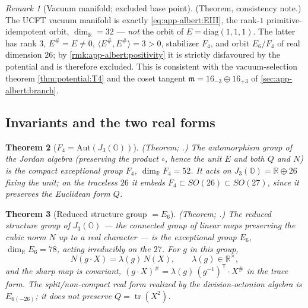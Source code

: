 \documentclass[11pt]{article}
\theoremstyle{plain}
\newtheorem{theorem}{Theorem}[section]
\theoremstyle{definition}
\theoremstyle{remark}
\newtheorem{remark}[theorem]{Remark}
\begin{document}
\begin{remark}[Vacuum manifold; excluded base point]\label{rmk:app-albert:vacuum}
\textup{(Theorem, consistency note.)}
The UCFT vacuum manifold is exactly \eqref{eq:app-albert:EIII}, the rank-$1$
primitive-idempotent orbit, $\dim_{\mathbb R}=32$ --- \emph{not} the orbit of
$E=\mathrm{diag}(1,1,1)$. The latter has rank $3$, $E^\#=E\neq0$,
$\langle E^\#,E^\#\rangle=3>0$, stabilizer $F_4$, and orbit $E_6/F_4$ of real
dimension $26$; by \autoref{rmk:app-albert:positivity} it is strictly disfavoured
by the potential and is therefore excluded. This is consistent with the
vacuum-selection theorem \autoref{thm:potential:T4} and the coset tangent
$\mathfrak m=16_{-3}\oplus\overline{16}_{+3}$ of \autoref{sec:app-albert:branch}.
\end{remark}

\subsection{Invariants and the two real forms}
\label{sec:app-albert:invariants}

\begin{theorem}[$F_4=\mathrm{Aut}(J_3(\mathbb O))$]\label{thm:app-albert:F4}
\label{thm:Invs}
\textup{(Theorem; \cite{Schafer:1966,Yokota:2009}.)}
The automorphism group of the Jordan algebra (preserving the product $\circ$,
hence the unit $E$ and \emph{both} $Q$ and $N$) is the compact exceptional group
$F_4$, $\dim_{\mathbb R}F_4=52$. It acts on $J_3(\mathbb O)=\mathbb R\oplus 26$
fixing the unit; on the traceless $26$ it embeds $F_4\subset SO(26)\subset
SO(27)$, since it preserves the Euclidean form $Q$.
\end{theorem}

\begin{theorem}[Reduced structure group $=E_6$]\label{thm:app-albert:E6}
\textup{(Theorem; \cite{Jacobson:1968,Springer:2000}.)}
The \emph{reduced structure group} of $J_3(\mathbb O)$ --- the connected group of
linear maps preserving the cubic norm $N$ up to a real character --- is the
exceptional group $E_6$, $\dim_{\mathbb R}E_6=78$, acting irreducibly on the $27$.
For $g$ in this group,
\begin{equation}\label{eq:app-albert:character}
  N(g\cdot X)=\lambda(g)\,N(X),\qquad \lambda(g)\in\mathbb R^\times,
\end{equation}
and the sharp map is covariant, $(g\cdot X)^\#=\lambda(g)\,(g^{-1})^{\mathsf T}\!
\cdot X^\#$ in the trace form. The split/non-compact real form realized by the
\emph{division}-octonion algebra is $E_{6(-26)}$; it does \emph{not} preserve
$Q=\operatorname{tr}(X^2)$.
\end{theorem}
\end{document}
